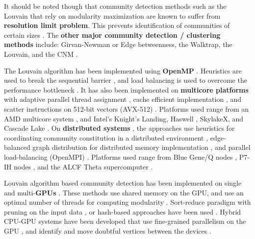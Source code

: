 It should be noted though that community detection methods such as the Louvain that rely on modularity maximization are known to suffer from \textbf{resolution limit problem}. This prevents identification of communities of certain sizes \cite{com-ghosh19}. The \textbf{other major community detection / clustering methods} include: Girvan-Newman or Edge betweenness, the Walktrap, the Louvain, and the CNM \cite{com-drakopoulos18}.

The Louvain algorithm has been implemented using \textbf{OpenMP} \cite{com-bhowmick13} \cite{com-lu15} \cite{com-sattar19}. Heuristics are used to break the sequential barrier \cite{com-lu15}, and load balancing is used to overcome the performance bottleneck \cite{com-sattar19}. It has also been implemented on \textbf{multicore platforms} \cite{com-fazlali17} \cite{com-gheibi20} \cite{part-hossain21} with adaptive parallel thread assignment \cite{com-fazlali17}, cache efficient implementation \cite{com-gheibi20}, and scatter instructions on 512-bit vectors (AVX-512) \cite{part-hossain21}. Platforms used range from an AMD multicore system \cite{com-fazlali17}, and Intel’s Knight's Landing, Haswell \cite{com-gheibi20}, SkylakeX, and Cascade Lake \cite{part-hossain21}. On \textbf{distributed systems} \cite{com-zeng18} \cite{com-ghosh19} \cite{com-sattar19}, the approaches use heuristics for coordinating community constitution in a distributed environment \cite{com-zeng18}, edge-balanced graph distribution for distributed memory implementation \cite{com-ghosh19}, and parallel load-balancing (OpenMPI) \cite{com-sattar19}. Platforms used range from Blue Gene/Q nodes \cite{com-zeng18}, P7-IH nodes \cite{com-zeng18}, and the ALCF Theta supercomputer \cite{com-ghosh19}.

Louvain algorithm based community detection has been implemented on single \cite{com-forster16} \cite{com-naim17} \cite{com-cheong13} \cite{com-mohammadi20} \cite{com-fontolan20} \cite{com-ghoshal19} \cite{com-sattar20} and multi-\textbf{GPUs} \cite{com-cheong13}. These methods use shared memory on the GPU, and use an optimal number of threads for computing modularity \cite{com-mohammadi20} \cite{com-naim17}. Sort-reduce paradigm with pruning on the input data \cite{com-fontolan20}, or hash-based approaches have been used \cite{com-naim17} \cite{com-fontolan20}. Hybrid CPU-GPU systems have been developed \cite{compute-hunold15} \cite{com-bhowmik19} \cite{com-souravlas20} \cite{com-alayyoub19} that use fine-grained parallelism on the GPU \cite{compute-hunold15}, and identify and move doubtful vertices between the devices \cite{com-bhowmik19}.

